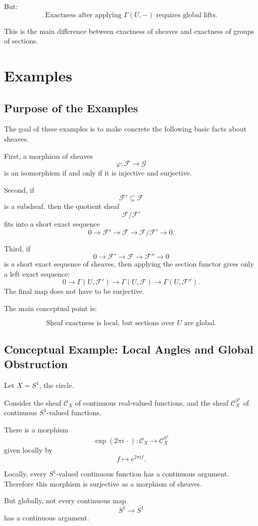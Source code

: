 \documentclass[12pt,a4paper]{article}
\newcommand{\F}{\mathcal F}
\newcommand{\G}{\mathcal G}
\theoremstyle{notespace}
\newcommand{\Fp}{\mathcal F'}      %
\newcommand{\Fpp}{\mathcal F''}
\begin{document}
But:
\[
\boxed{
	\text{Exactness after applying }\Gamma(U,-)\text{ requires global lifts.}
}
\]

This is the main difference between exactness of sheaves and exactness of groups of sections.


\section{Examples}

\subsection{Purpose of the Examples}

The goal of these examples is to make concrete the following basic facts about sheaves.

First, a morphism of sheaves
\[
\varphi:\F\to \G
\]
is an isomorphism if and only if it is injective and surjective.

Second, if
\[
\Fp\subseteq \F
\]
is a subsheaf, then the quotient sheaf
\[
\F/\Fp
\]
fits into a short exact sequence
\[
0\to \Fp\to \F\to \F/\Fp\to 0.
\]

Third, if
\[
0\to \Fp\to \F\to \Fpp\to 0
\]
is a short exact sequence of sheaves, then applying the section functor gives only a left exact sequence:
\[
0\to \Gamma(U,\Fp)\to \Gamma(U,\F)\to \Gamma(U,\Fpp).
\]
The final map does not have to be surjective.

The main conceptual point is:

\[
\boxed{
	\text{Sheaf exactness is local, but sections over }U\text{ are global.}
}
\]


\subsection{Conceptual Example: Local Angles and Global Obstruction}

Let \(X=S^1\), the circle.

Consider the sheaf \(\mathcal C_X\) of continuous real-valued functions, and the sheaf \(\mathcal C_X^{S^1}\) of continuous \(S^1\)-valued functions.

There is a morphism
\[
\exp(2\pi i\,\cdot):\mathcal C_X\to \mathcal C_X^{S^1}
\]
given locally by
\[
f\mapsto e^{2\pi i f}.
\]

Locally, every \(S^1\)-valued continuous function has a continuous argument. Therefore this morphism is surjective as a morphism of sheaves.

But globally, not every continuous map
\[
S^1\to S^1
\]
has a continuous argument.
\end{document}
